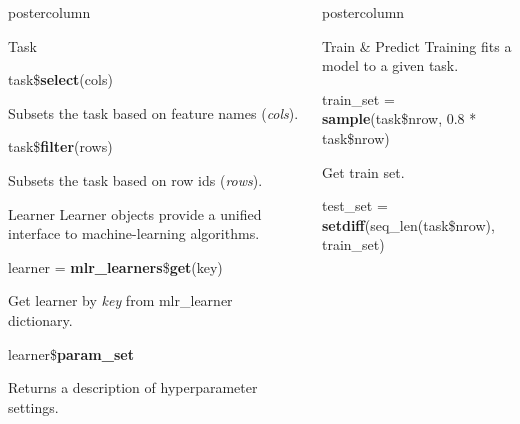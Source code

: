 \documentclass{beamer}
\newlength{\columnheight} %
\begin{document}
\begin{frame}[fragile]{}
\begin{columns}
\begin{column}{.31\textwidth}
\begin{beamercolorbox}[center]{postercolumn}
\begin{minipage}{.98\textwidth}
{\begin{myblock}{Task}
\begin{codebox}
							task\$\textbf{select}(cols)
						\end{codebox}
						\hspace*{1ex}Subsets the task based on feature names (\textit{cols}).
						\\
						\begin{codebox}
							task\$\textbf{filter}(rows)
						\end{codebox}
						\hspace*{1ex}Subsets the task based on row ids (\textit{rows}).
					\end{myblock}
					\begin{myblock}{Learner}
						Learner objects provide a unified interface to machine-learning algorithms.
						\\
						\begin{codebox}
							learner = \textbf{mlr\_learners}\$\textbf{get}(key)
						\end{codebox}
						\hspace*{1ex}Get learner by \textit{key} from mlr\_learner dictionary.
						\\
						\begin{codebox}
							learner\$\textbf{param\_set}
						\end{codebox}
						\hspace*{1ex}Returns a description of hyperparameter settings.
					\end{myblock}\vfill
				}
			\end{minipage}
		\end{beamercolorbox}
	\end{column}
	\begin{column}{.31\textwidth}
		\begin{beamercolorbox}[center]{postercolumn}
			\begin{minipage}{.98\textwidth}
				\parbox[t][\columnheight]{\textwidth}{
					\begin{myblock}{Train \& Predict}
						Training fits a model to a given task. 
						\\
						\begin{codebox}
							train\_set = \textbf{sample}(task\$nrow, 0.8 * task\$nrow)
						\end{codebox}
						\hspace*{1ex}Get train set.
						\\
						\begin{codebox}
							test\_set = \textbf{setdiff}(seq\_len(task\$nrow), train\_set)
						\end{codebox}

\end{myblock}}
\end{minipage}
\end{beamercolorbox}
\end{column}
\end{columns}
\end{frame}
\end{document}
